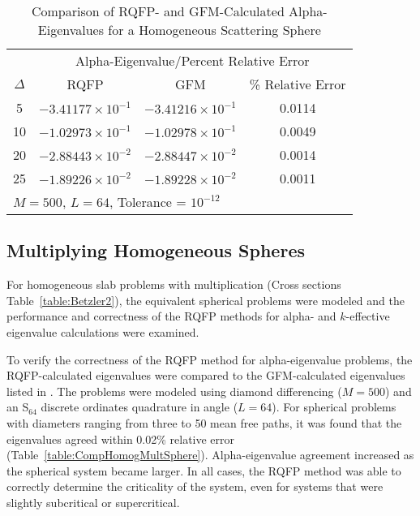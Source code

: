 \begin{table*}[!htbp]
\centering{}
\caption{Comparison of RQFP- and GFM-Calculated Alpha-Eigenvalues for a Homogeneous Scattering Sphere}
\label{table:CompHomogScattSphere}
\begin{tabular}{@{}cccc@{}}\toprule
& \multicolumn{3}{c}{Alpha-Eigenvalue/Percent Relative Error} \\
\cmidrule{2-4} $\Delta$ & RQFP & GFM & \% Relative Error \\
\midrule
5 & $-3.41177 \times 10^{-1}$ & $-3.41216 \times 10^{-1}$ & 0.0114 \\ 
10 & $-1.02973 \times 10^{-1}$ & $-1.02978 \times 10^{-1}$ & 0.0049 \\ 
20 & $-2.88443 \times 10^{-2}$ & $-2.88447 \times 10^{-2}$ & 0.0014 \\ 
25 & $-1.89226 \times 10^{-2}$ & $-1.89228 \times 10^{-2}$ & 0.0011 \\ 
\bottomrule
\multicolumn{4}{l}{$M = 500$, $L = 64$, Tolerance = $10^{-12}$} \\
\end{tabular}
\end{table*}

\subsection{Multiplying Homogeneous Spheres}

For homogeneous slab problems with multiplication (Cross sections Table~\ref{table:Betzler2}), the equivalent spherical problems were modeled and the performance and correctness of the RQFP methods for alpha- and $k$-effective eigenvalue calculations were examined.

To verify the correctness of the RQFP method for alpha-eigenvalue problems, the RQFP-calculated eigenvalues were compared to the GFM-calculated eigenvalues listed in \cite{kornreich_greens_1997}. The problems were modeled using diamond differencing ($M=500$) and an S$_{64}$ discrete ordinates quadrature in angle ($L=64$). For spherical problems with diameters ranging from three to 50 mean free paths, it was found that the eigenvalues agreed within 0.02\% relative error (Table~\ref{table:CompHomogMultSphere}). Alpha-eigenvalue agreement increased as the spherical system became larger. In all cases, the RQFP method was able to correctly determine the criticality of the system, even for systems that were slightly subcritical or supercritical.

